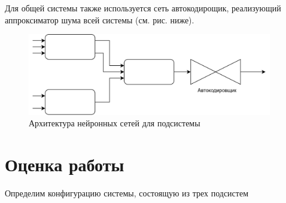 Для общей системы также используется сеть автокодирощик, реализующий аппроксиматор шума всей системы (см. рис. ниже).

\begin{figure}[H]
  \begin{center}
    \includegraphics[width=0.95\textwidth]{figures/nn_full.png}
  \end{center}
  \caption{Архитектура нейронных сетей для подсистемы}\label{fig:nn:full}
\end{figure}

\section{Оценка работы}

Определим конфигурацию системы, состоящую из трех подсистем

